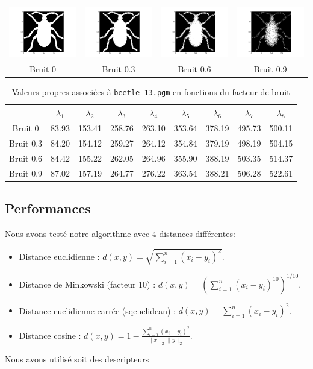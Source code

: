 \documentclass[a4paper,10pt]{article} %
\theoremstyle{definition} %
\begin{document}
\begin{center}
  \begin{tabular}{c c c c}
    \includegraphics[scale=0.15]{noise/0.png} & \includegraphics[scale=0.15]{noise/0_3.png} & \includegraphics[scale=0.15]{noise/0_6.png} & \includegraphics[scale=0.15]{noise/0_9.png} \\
    Bruit 0 & Bruit 0.3 & Bruit 0.6 & Bruit 0.9
  \end{tabular}
\end{center}

\begin{table}[H]
  \begin{center}
    \begin{tabular}{c | c c c c c c c c}
                 & $\lambda_1$ & $\lambda_2$ & $\lambda_3$ & $\lambda_4$ & $\lambda_5$ & $\lambda_6$ & $\lambda_7$ & $\lambda_8$ \\ \hline
      Bruit 0    & 83.93 & 153.41 & 258.76 & 263.10 & 353.64 & 378.19 & 495.73 & 500.11 \\
      Bruit 0.3  & 84.20 & 154.12 & 259.27 & 264.12 & 354.84 & 379.19 & 498.19 & 504.15 \\
      Bruit 0.6  & 84.42 & 155.22 & 262.05 & 264.96 & 355.90 & 388.19 & 503.35 & 514.37 \\
      Bruit 0.9  & 87.02 & 157.19 & 264.77 & 276.22 & 363.54 & 388.21 & 506.28 & 522.61  
    \end{tabular}
  \end{center}
  \caption{Valeurs propres associées à \texttt{beetle-13.pgm} en fonctions du facteur de bruit}
  \label{bruit}
\end{table}


  \subsection{Performances}

Nous avons testé notre algorithme avec 4 distances différentes: 
\begin{itemize}
  \item Distance euclidienne : $d(x,y) = \sqrt{\sum_{i=1}^n (x_i-y_i)^2}$.
  \item Distance de Minkowski (facteur 10) : $d(x,y) = \left(\sum_{i=1}^n (x_i-y_i)^{10}\right)^{1/10}$.
  \item Distance euclidienne carrée (sqeuclidean) : $d(x,y) = \sum_{i=1}^n (x_i-y_i)^2$.
  \item Distance cosine : $d(x,y) = 1 - \frac{\sum_{i=1}^n (x_i-y_i)^2}{\lVert x \rVert_2 \lVert y \rVert_2}$.
\end{itemize}

Nous avons utilisé soit des descripteurs
\end{document}
